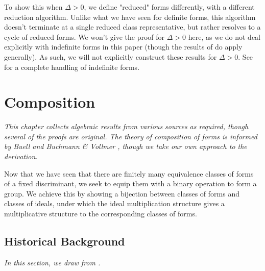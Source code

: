 \documentclass[honours,12pt]{unswthesis}
\numberwithin{equation}{section}
\begin{document}
\vspace{2mm}
To show this when $\Delta > 0$, we define "reduced" forms differently, with a different reduction algorithm.
Unlike what we have seen for definite forms, this algorithm doesn't terminate at a single reduced class representative, but rather resolves to a cycle of reduced forms.
We won't give the proof for $\Delta > 0$ here, as we do not deal explicitly with indefinite forms in this paper (though the results of  do apply generally).
As such, we will not explicitly construct these results for $\Delta > 0$.
See \cite[\S\,3.1]{buell} for a complete handling of indefinite forms.



\chapter{Composition}\label{s-comp}
\emph{
    This chapter collects algebraic results from various sources as required, though several of the proofs are original.
    The theory of composition of forms is informed by Buell \cite[Ch.\,6-7]{buell} and Buchmann \& Vollmer \cite[Ch.\,7]{buchmann}, though we take our own approach to the derivation.
}

\vspace{2mm}
\noindent
Now that we have seen that there are finitely many equivalence classes of forms of a fixed discriminant, we seek to equip them with a binary operation to form a group.
We achieve this by showing a bijection between classes of forms and classes of ideals, under which the ideal multiplication structure gives a multiplicative structure to the corresponding classes of forms.

\section{Historical Background}
\emph{In this section, we draw from \cite[\S\,2D-\S\,3A]{cox}.}
\end{document}

